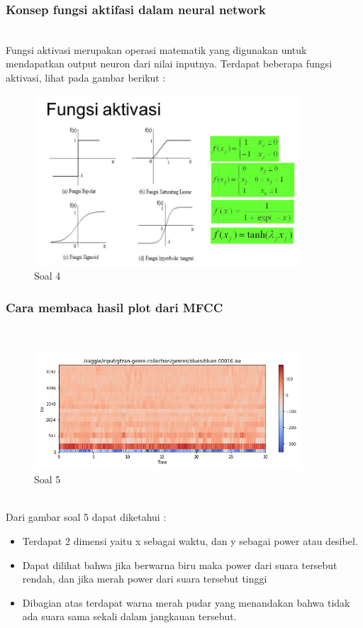 	\subsubsection{Konsep fungsi aktifasi dalam neural network}
	\hfill\\
	Fungsi aktivasi merupakan operasi matematik yang digunakan untuk mendapatkan output neuron dari nilai inputnya. Terdapat beberapa fungsi aktivasi, lihat pada gambar berikut :

	\begin{figure}[H]
		\begin{center}
		 \includegraphics[width=10cm]{figures/1174076/figures6/teori4.png}
		 \caption{Soal 4}	
		\end{center}
	\end{figure}	
	
	\subsubsection{Cara membaca hasil plot dari MFCC} 
	\hfill\\
	\begin{figure}[H]
		\begin{center}
		 \includegraphics[width=10cm]{figures/1174076/figures6/teori5.png}
		 \caption{Soal 5}	
		\end{center}
	\end{figure}	
	
	\hfill\\
	Dari gambar soal 5 dapat diketahui :
	\begin{itemize}
		\item Terdapat 2 dimensi yaitu x sebagai waktu, dan y sebagai power atau desibel.
		\item Dapat dilihat bahwa jika berwarna biru maka power dari suara tersebut rendah, dan jika merah power dari suara tersebut tinggi
		\item Dibagian atas terdapat warna merah pudar yang menandakan bahwa tidak ada suara sama sekali dalam jangkauan tersebut.
	\end{itemize}
	 
